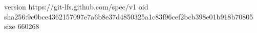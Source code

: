 version https://git-lfs.github.com/spec/v1
oid sha256:9c0bce4362157097e7a6b8e37d4850325a1c83f96cef2bcb398e01b918b70805
size 660268
